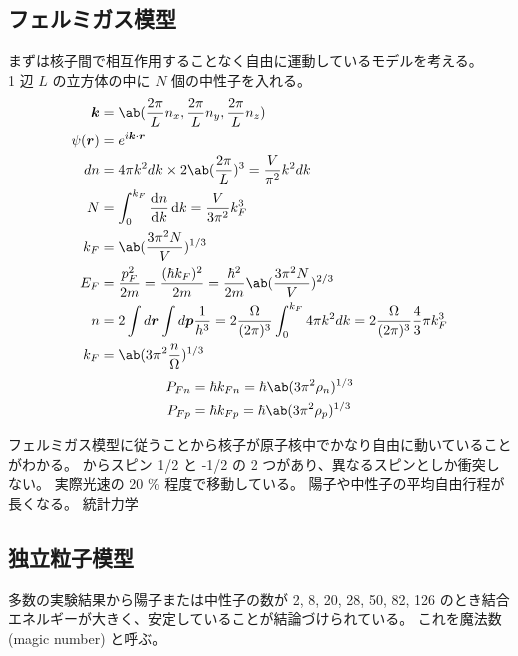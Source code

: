 \documentclass[uplatex,dvipdfmx,a4paper,11pt]{jlreq}
\newcommand{\rr}{\bm{r}}
\newcommand{\kk}{\bm{k}}
\newcommand{\pp}{\bm{p}}
\numberwithin{equation}{section}
\theoremstyle{definition}
\begin{document}
\subsection{フェルミガス模型}
まずは核子間で相互作用することなく自由に運動しているモデルを考える。 \\

1 辺 $L$ の立方体の中に $N$ 個の中性子を入れる。
\begin{align}
  \bm{k}    & = \ab(\frac{2\pi}{L}n_x, \frac{2\pi}{L}n_y, \frac{2\pi}{L}n_z)                                                                       \\
  \psi(\rr) & = e^{i\kk\cdot\rr}                                                                                                                   \\
  dn        & = 4\pi k^2dk \times 2 \ab(\frac{2\pi}{L})^3 = \frac{V}{\pi^2}k^2dk                                                                   \\
  N         & = \int_0^{k_F}\diff{n}{k}\dl{k} = \frac{V}{3\pi^2}k_F^3                                                                              \\
  k_F       & = \ab(\frac{3\pi^2 N}{V})^{1/3}                                                                                                      \\
  E_F       & = \frac{p_F^2}{2m} = \frac{(\hbar k_F)^2}{2m} = \frac{\hbar^2}{2m}\ab(\frac{3\pi^2 N}{V})^{2/3}                                      \\
  n         & = 2\int d\rr \int d\pp \frac{1}{h^3} = 2\frac{\Omega}{(2\pi)^3}\int_0^{k_F}4\pi k^2dk = 2\frac{\Omega}{(2\pi)^3}\frac{4}{3}\pi k_F^3 \\
  k_F       & = \ab(3\pi^2\frac{n}{\Omega})^{1/3}
\end{align}
\begin{align}
  P_{Fn} & = \hbar k_{Fn} = \hbar\ab(3\pi^2\rho_n)^{1/3} \\
  P_{Fp} & = \hbar k_{Fp} = \hbar\ab(3\pi^2\rho_p)^{1/3}
\end{align}

フェルミガス模型に従うことから核子が原子核中でかなり自由に動いていることがわかる。
からスピン 1/2 と -1/2 の 2 つがあり、異なるスピンとしか衝突しない。
実際光速の 20 \% 程度で移動している。
陽子や中性子の平均自由行程が長くなる。
統計力学



\subsection{独立粒子模型}
多数の実験結果から陽子または中性子の数が 2, 8, 20, 28, 50, 82, 126 のとき結合エネルギーが大きく、安定していることが結論づけられている。
これを魔法数 (magic number) と呼ぶ。
\end{document}
